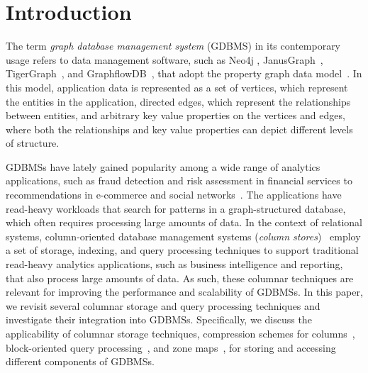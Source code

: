 
\chapter{Introduction}
\label{introduction}

The term {\em graph database management system} (GDBMS) in its contemporary usage refers to data management software, such as Neo4j \cite{neo4j}, JanusGraph~\cite{janusgraph}, TigerGraph~\cite{tigergraph}, and GraphflowDB~\cite{kankanamge:graphflow, mhedhbi:sqs}, that adopt the property graph data model~\cite{neo4j-property-graph-model}. 
In this model, application data is represented as a set of vertices, which represent the entities in the application, directed edges, which represent the relationships between entities,  and arbitrary key value properties on the vertices and edges, where both the relationships and key value properties can depict different levels of structure. 

GDBMSs have lately gained popularity among a wide range of analytics applications, such as fraud detection and risk assessment in financial services to recommendations in e-commerce and social networks~\cite{sahu:survey}. The applications have read-heavy workloads that search for patterns in a graph-structured database, which often requires processing large amounts of data. 
In the context of relational systems, column-oriented database management systems ({\em column stores})~\cite{c-store, monetdb, vectorwise, oracle, ziauddin:zone-maps, ms} employ a set of storage, indexing, and query processing techniques to support traditional read-heavy analytics applications, such as business intelligence and reporting, that also process large amounts of data. As such, these columnar techniques are relevant for improving the performance and scalability of GDBMSs.
In this paper, we revisit several columnar storage and query processing techniques and investigate their integration into GDBMSs. Specifically, we discuss the applicability of columnar storage techniques, compression schemes for columns~\cite{}, block-oriented query processing~\cite{}, and zone maps~\cite{}, for storing and accessing different components of GDBMSs. 


